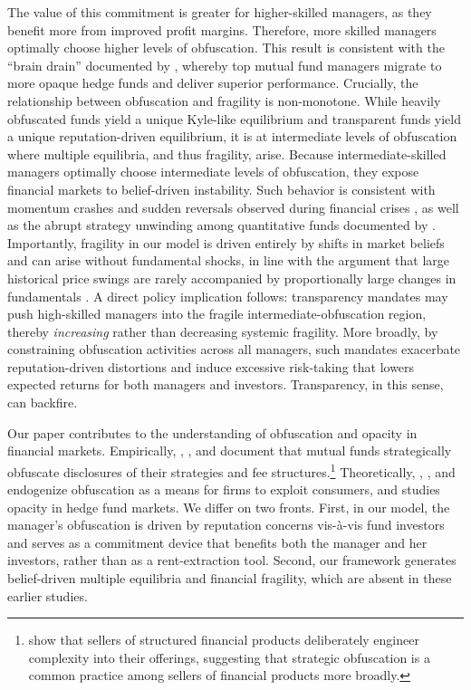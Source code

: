 The value of this commitment is greater for higher-skilled managers, as they benefit more from improved profit margins. Therefore, more skilled managers optimally choose higher levels of obfuscation. This result is consistent with the ``brain drain'' documented by \citet{kostovetsky2017brain}, whereby top mutual fund managers migrate to more opaque hedge funds and deliver superior performance. Crucially, the relationship between obfuscation and fragility is non-monotone. While heavily obfuscated funds yield a unique Kyle-like equilibrium and transparent funds yield a unique reputation-driven equilibrium, it is at intermediate levels of obfuscation where multiple equilibria, and thus fragility, arise. Because intermediate-skilled managers optimally choose intermediate levels of obfuscation, they expose financial markets to belief-driven instability. Such behavior is consistent with momentum crashes and sudden reversals observed during financial crises \citep{brunnermeier2009deciphering}, as well as the abrupt strategy unwinding among quantitative funds documented by \citet{khandani2011what}. Importantly, fragility in our model is driven entirely by shifts in market beliefs and can arise without fundamental shocks, in line with the argument that large historical price swings are rarely accompanied by proportionally large changes in fundamentals \citep{gennotte1999market}. A direct policy implication follows: transparency mandates may push high-skilled managers into the fragile intermediate-obfuscation region, thereby \textit{increasing} rather than decreasing systemic fragility. More broadly, by constraining obfuscation activities across all managers, such mandates exacerbate reputation-driven distortions and induce excessive risk-taking that lowers expected returns for both managers and investors. Transparency, in this sense, can backfire.

Our paper contributes to the understanding of obfuscation and opacity in financial markets. Empirically, \citet*{edelen2012disclosure}, \citet*{badoera2020icansee}, and \citet*{dehaan2021obfuscation} document that mutual funds strategically obfuscate disclosures of their strategies and fee structures.\footnote{\citet{celerier2019returns} show that sellers of structured financial products deliberately engineer complexity into their offerings, suggesting that strategic obfuscation is a common practice among sellers of financial products more broadly.} 
Theoretically, \citet{carlin2009strategic}, \citet{carlin2010obfuscation}, and \citet{ellison2012search} endogenize obfuscation as a means for firms to exploit consumers, and \citet{sato2014opacity} studies opacity in hedge fund markets. We differ on two fronts. First, in our model, the manager's obfuscation is driven by reputation concerns vis-à-vis fund investors and serves as a commitment device that benefits both the manager and her investors, rather than as a rent-extraction tool. Second, our framework generates belief-driven multiple equilibria and financial fragility, which are absent in these earlier studies.

